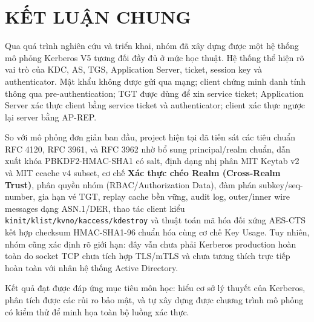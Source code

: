 \documentclass[12pt]{article}
\begin{document}
\newpage
\section*{KẾT LUẬN CHUNG}

Qua quá trình nghiên cứu và triển khai, nhóm đã xây dựng được một hệ thống mô phỏng Kerberos V5 tương đối đầy đủ ở mức học thuật. Hệ thống thể hiện rõ vai trò của KDC, AS, TGS, Application Server, ticket, session key và authenticator. Mật khẩu không được gửi qua mạng; client chứng minh danh tính thông qua pre-authentication; TGT được dùng để xin service ticket; Application Server xác thực client bằng service ticket và authenticator; client xác thực ngược lại server bằng AP-REP.

So với mô phỏng đơn giản ban đầu, project hiện tại đã tiến sát các tiêu chuẩn RFC 4120, RFC 3961, và RFC 3962 nhờ bổ sung principal/realm chuẩn, dẫn xuất khóa PBKDF2-HMAC-SHA1 có salt, định dạng nhị phân MIT Keytab v2 và MIT ccache v4 subset, cơ chế \textbf{Xác thực chéo Realm (Cross-Realm Trust)}, phân quyền nhóm (RBAC/Authorization Data), đàm phán subkey/seq-number, gia hạn vé TGT, replay cache bền vững, audit log, outer/inner wire messages dạng ASN.1/DER, thao tác client kiểu \texttt{kinit/klist/kvno/kaccess/kdestroy} và thuật toán mã hóa đối xứng AES-CTS kết hợp checksum HMAC-SHA1-96 chuẩn hóa cùng cơ chế Key Usage. Tuy nhiên, nhóm cũng xác định rõ giới hạn: đây vẫn chưa phải Kerberos production hoàn toàn do socket TCP chưa tích hợp TLS/mTLS và chưa tương thích trực tiếp hoàn toàn với nhân hệ thống Active Directory.

Kết quả đạt được đáp ứng mục tiêu môn học: hiểu cơ sở lý thuyết của Kerberos, phân tích được các rủi ro bảo mật, và tự xây dựng được chương trình mô phỏng có kiểm thử để minh họa toàn bộ luồng xác thực.

\newpage
\end{document}
